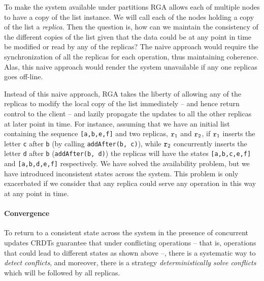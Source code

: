 To make the system available under partitions RGA allows each of
multiple nodes to have a copy of the list instance.
%
We will call each of the nodes holding a copy of the list a \emph{replica}.
%
Then the question is, how can we maintain the consistency of the
different copies of the list given that the data could be at any point
in time be modified or read by any of the replicas?
%
The naive approach would require the synchronization of all the
replicas for each operation, thus maintaining coherence.
%
Alas, this naive approach would render the system unavailable if any
one replicas goes off-line.
%

Instead of this naive approach, RGA takes the liberty of allowing any
of the replicas to modify the local copy of the list immediately --
and hence return control to the client -- and lazily propagate the
updates to all the other replicas at later point in time.
%
For instance, assuming that we have an initial list containing the
sequence \lstinline|[a,b,e,f]| and two replicas, $\mathtt{r}_1$ and
$\mathtt{r}_2$, if $\mathtt{r}_1$ inserts the letter \lstinline|c| after
\lstinline|b| (by calling \lstinline|addAfter(b, c)|), while $\mathtt{r}_2$
concurrently inserts the letter \lstinline|d| after \lstinline|b|
(\lstinline|addAfter(b, d)|) the replicas will have the states
\lstinline|[a,b,c,e,f]| and \lstinline|[a,b,d,e,f]|
respectively.
%
We have solved the availability problem, but we have introduced
inconsistent states across the system.
%
This problem is only exacerbated if we consider that any replica could
serve any operation in this way at any point in time.

\paragraph{Convergence}

To return to a consistent state across the system in the presence of
concurrent updates CRDTs guarantee that under conflicting operations --
that is, operations that could lead to different states as shown above
--, there is a systematic way to \emph{detect conflicts}, and moreover, there
is a strategy \emph{deterministically solve conflicts} which will be followed
by all replicas.


